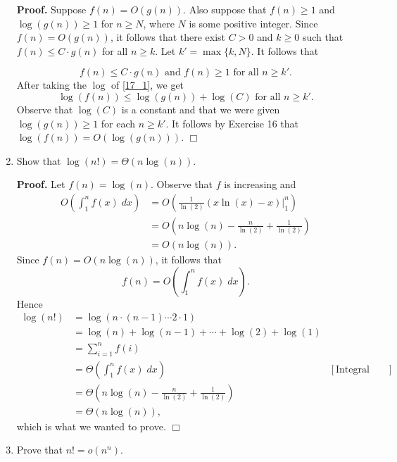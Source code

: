 \documentclass[9pt]{article}
\newcommand{\qed}{\hfill \ensuremath{\Box}}
\begin{document}
\begin{enumerate}
      \textbf{Proof.} Suppose $f(n) = O(g(n))$. Also suppose that $f(n) \ge 1$
      and $\log(g(n)) \ge 1$ for $n \ge N$, where $N$ is some positive integer.
      Since $f(n) = O(g(n))$, it follows that there exist $C > 0$ and $k \ge 0$
      such that $f(n) \le C \cdot g(n)$ for all $n \ge k$. Let
      $k' = \max\{k, N\}$. It follows that 

      \begin{equation} \label{17_1}
         f(n) \le C \cdot g(n) \text{ and } f(n) \ge 1 \text{ for all }n \ge k'.
      \end{equation}
      After taking the $\log$ of \eqref{17_1}, we get
      $$\log(f(n)) \le \log(g(n)) + \log(C) \text{ for all }n \ge k'.$$
      Observe that $\log(C)$ is a constant and that we were given
      $\log(g(n)) \ge 1$ for each $n \ge k'$. It follows by Exercise 16 that
      $\log(f(n)) = O(\log(g(n)))$. \qed
   \item Show that $\log(n!) = \Theta(n\log(n))$.

      \textbf{Proof.} Let $f(n) = \log(n)$. Observe that $f$ is increasing and
      \begin{align*}
         O\left(\int_1^nf(x)\;dx\right) &=
            O\left(\frac{1}{\ln(2)}(x\ln(x) - x)\bigg|_1^n\right) \\
            &= O\left(n\log(n) - \frac{n}{\ln(2)} + \frac{1}{\ln(2)}\right) \\
            &= O(n\log(n)).
      \end{align*}
      Since $f(n) = O(n\log(n))$, it follows that
      $$f(n) = O\left(\int_1^nf(x)\;dx\right).$$
      Hence
      \begin{align*}
         \log(n!) &= \log(n \cdot (n - 1) \cdots 2 \cdot 1) \\
            &= \log(n) + \log(n-1) + \cdots + \log(2) + \log(1) \\
            &= \sum_{i=1}^nf(i) \\
            &= \Theta\left(\int_1^nf(x)\;dx\right) &[\text{Integral Theorem}] \\
            &= \Theta\left(n\log(n) - \frac{n}{\ln(2)} +
                  \frac{1}{\ln(2)}\right) \\
            &= \Theta(n\log(n)),
      \end{align*}
      which is what we wanted to prove. \qed
   \item Prove that $n! = o(n^n)$.


\end{enumerate}
\end{document}
